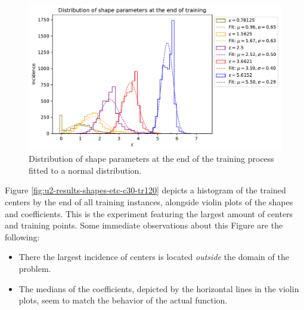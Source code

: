 \documentclass[12pt]{report} %
\begin{document}
\begin{figure}
  \includegraphics[width=\textwidth]{imagenes/experiments/1d/statistical_1d_full_scheduler_interpolation/distribution_of_shape_parameters_at_end_of_training.pdf}
  \caption{Distribution of shape parameters at the end of the training process fitted to a normal distribution.}
  \label{fig:u2-results-shape-parameters}
\end{figure}




Figure \ref{fig:u2-results-shapes-etc-c30-tr120} depicts a histogram of the trained centers by the end of all training instances, alongside violin plots of the shapes and coefficients. This is the experiment featuring the largest amount of centers and training points. Some immediate observations about this Figure are the following: \begin{itemize}
  \item There the largest incidence of centers is located \textit{outside} the domain of the problem.
  \item The medians of the coefficients, depicted by the horizontal lines in the violin plots, seem to match the behavior of the actual function.
\end{itemize}
\end{document}
